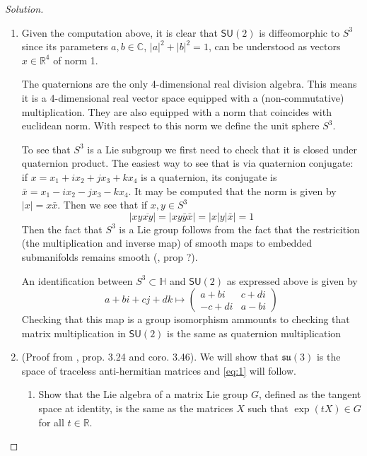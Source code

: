 \begin{proof}[Solution]\leavevmode
	\begin{enumerate}[label=\alph*.]
		\item Given the computation {\color{2}above}, it is clear that $\mathsf{SU}(2)$ is diffeomorphic to $S^3$ since its parameters $a,b\in\mathbb{C}$, $|a|^2+|b|^2=1$, can be understood as vectors $x\in\mathbb{R}^{4}$ of norm 1.

		The quaternions are the only 4-dimensional real division algebra. This means it is a 4-dimensional real vector space equipped with a (non-commutative) multiplication. They are also equipped with a norm that coincides with euclidean norm. With respect to this norm we define the unit sphere $S^3$. 
		
			To see that $S^3$ is a Lie subgroup we first need to check that it is closed under quaternion product. The easiest way to see that is via quaternion conjugate: if $x=x_1+ix_2+jx_3+kx_4$ is a quaternion, its conjugate is $\bar{x}=x_1-ix_2-jx_3-kx_4$. It may be computed that the norm is given by $|x| =x\bar{x}$. Then we see that if $x,y\in S^3$
			\[|xy\overline{xy}|=|xy\bar{y}\bar{x}| =\Big|x|y| \bar{x}\Big|=1\]
			Then the fact that $S^3$ is a Lie group follows from the fact that the restricition (the multiplication and inverse map) of smooth maps to embedded submanifolds remains smooth (\cite{lee}, prop ?).

			An identification between $S^3\subset \mathbb{H}$ and $\mathsf{SU}(2)$ as expressed above is given by
			\[a+bi+cj+dk\longmapsto \begin{pmatrix} a+bi&c+di\\-c+di&a-bi\end{pmatrix} \]
			Checking that this map is a group isomorphism ammounts to checking that matrix multiplication in $\mathsf{SU}(2)$ is the same as quaternion multiplication 


			\item (Proof from \cite{hall}, prop. 3.24 and coro. 3.46). We will show that $\mathfrak{su}(3)$ is the space of traceless anti-hermitian matrices and \cref{eq:1} will follow.
				\begin{enumerate}[label=\textbf{Step \arabic*}]
					\item Show that the Lie algebra of a matrix Lie group $G$, defined as the tangent space at identity, is the same as the matrices $X$ such that $ \operatorname{exp}(tX) \in G$ for all $t\in\mathbb{R}$.


\end{enumerate}
\end{enumerate}
\end{proof}
